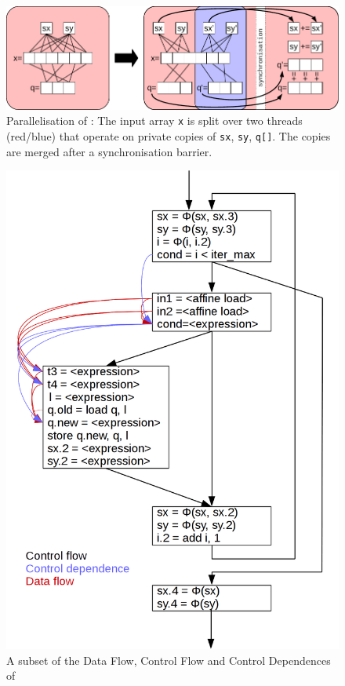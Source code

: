 \begin{figure}[t]
\centering
\includegraphics[width=\textwidth]{figures/parallelisereduction.pdf}
\caption{Parallelisation of :
         The input array \texttt{x} is split over two threads (red/blue)
         that operate on private copies of \texttt{sx}, \texttt{sy}, \texttt{q[]}.
         The copies are merged after a synchronisation barrier.}
\label{nice-picture}
\end{figure}

\begin{figure}[p]
\centering
\includegraphics[width=\textwidth]{figures/nicepicture2.png}
\caption{A subset of the Data Flow, Control Flow and Control Dependences of
         }
\label{nice-picture2}
\end{figure}

